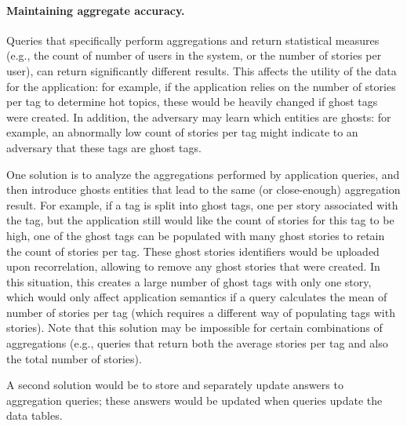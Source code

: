 \paragraph{Maintaining aggregate accuracy.}
Queries that specifically perform aggregations and return statistical measures (e.g.,
the count of number of users in the system, or the number of stories per user), can return
significantly different results. This affects the utility of the data for the application: for
example, if the application relies on the number of stories per tag to determine hot topics, these
would be heavily changed if ghost tags were created.  In addition, the adversary may learn which
entities are ghosts: for example, an abnormally low count of stories per tag might indicate to an
adversary that these tags are ghost tags.  

One solution is to analyze the aggregations performed by application queries, and then
introduce ghosts entities that lead to the same (or close-enough) aggregation result. For example,
if a tag is split into ghost tags, one per story associated with the tag, but the application still
would like the count of stories for this tag to be high, one of the ghost tags can be populated with
many ghost stories to retain the count of stories per tag. These ghost stories identifiers would be
uploaded upon recorrelation, allowing \sys{} to remove any ghost stories that were created. In this
situation, this creates a large number of ghost tags with only one story, which would only affect
application semantics if a query calculates the mean of number of stories per tag (which requires a
different way of populating tags with stories). Note that this solution may be impossible for  
certain combinations of aggregations (e.g., queries that return both the average stories per tag and also
the total number of stories).

A second solution would be to store and separately update answers to aggregation queries;
these answers would be updated when queries update the data tables.

